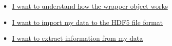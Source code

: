 \begin{tcolorbox}[title=What are you looking for?]
    \begin{itemize}
        \item \hyperref[sec:wrapper]{I want to understand how the wrapper object works}
        \item \hyperref[sec:load_data]{I want to import my data to the HDF5 file format}
        \item \hyperref[sec:treatment]{I want to extract information from my data }
    \end{itemize}
\end{tcolorbox}